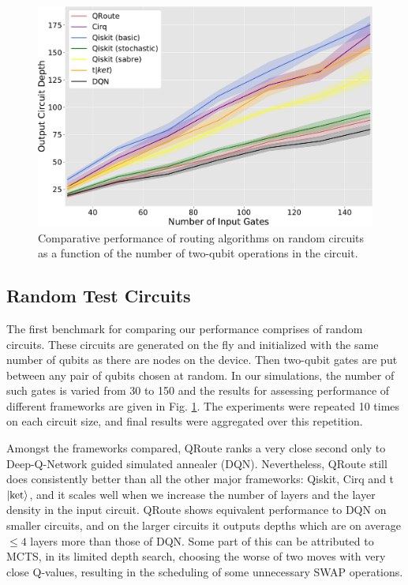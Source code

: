 \begin{figure}[t]
    \includegraphics[width=\linewidth]{figures/qroute/random_benchmark.pdf}
    \caption[qRoute Results on randomly generated circuits]{\label{fig:results-random}
        Comparative performance of routing algorithms on random circuits as a function of the number of two-qubit operations in the circuit.}
\end{figure}

\subsection{\label{sec:results-random}Random Test Circuits}

The first benchmark for comparing our performance comprises of random circuits. These circuits are generated on the fly and initialized with the same number of qubits as there are nodes on the device. Then two-qubit gates are put between any pair of qubits chosen at random. In our simulations, the number of such gates is varied from 30 to 150 and the results for assessing performance of different frameworks are given in Fig. \ref{fig:results-random}. The experiments were repeated 10 times on each circuit size, and final results were aggregated over this repetition. 


Amongst the frameworks compared, QRoute ranks a very close second only to Deep-Q-Network guided simulated annealer (DQN). Nevertheless, QRoute still does consistently better than all the other major frameworks: Qiskit, Cirq and t$\ket{\text{ket}}$, and it scales well when we increase the number of layers and the layer density in the input circuit. QRoute shows equivalent performance to DQN on smaller circuits, and on the larger circuits it outputs depths which are on average $\leq 4$ layers more than those of DQN. Some part of this can be attributed to MCTS, in its limited depth search, choosing the worse of two moves with very close Q-values, resulting in the scheduling of some unnecessary SWAP operations.



